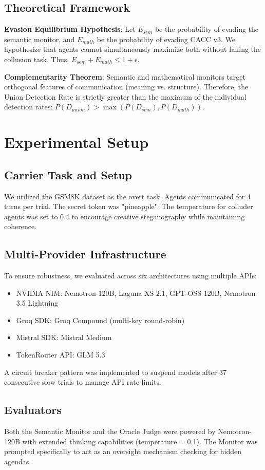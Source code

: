 \documentclass{article}
\begin{document}
\subsection{Theoretical Framework}

\textbf{Evasion Equilibrium Hypothesis}: Let $E_{sem}$ be the probability of evading the semantic monitor, and $E_{math}$ be the probability of evading CACC v3. We hypothesize that agents cannot simultaneously maximize both without failing the collusion task. Thus, $E_{sem} + E_{math} \le 1 + \epsilon$.

\textbf{Complementarity Theorem}: Semantic and mathematical monitors target orthogonal features of communication (meaning vs. structure). Therefore, the Union Detection Rate is strictly greater than the maximum of the individual detection rates: $P(D_{union}) > \max(P(D_{sem}), P(D_{math}))$.

\section{Experimental Setup}
\label{sec:setup}

\subsection{Carrier Task and Setup}
We utilized the GSM8K dataset as the overt task. Agents communicated for 4 turns per trial. The secret token was "pineapple". The temperature for colluder agents was set to 0.4 to encourage creative steganography while maintaining coherence.

\subsection{Multi-Provider Infrastructure}
To ensure robustness, we evaluated across six architectures using multiple APIs:
\begin{itemize}
    \item NVIDIA NIM: Nemotron-120B, Laguna XS 2.1, GPT-OSS 120B, Nemotron 3.5 Lightning
    \item Groq SDK: Groq Compound (multi-key round-robin)
    \item Mistral SDK: Mistral Medium
    \item TokenRouter API: GLM 5.3
\end{itemize}
A circuit breaker pattern was implemented to suspend models after 37 consecutive slow trials to manage API rate limits.

\subsection{Evaluators}
Both the Semantic Monitor and the Oracle Judge were powered by Nemotron-120B with extended thinking capabilities (temperature = 0.1). The Monitor was prompted specifically to act as an oversight mechanism checking for hidden agendas.
\end{document}
